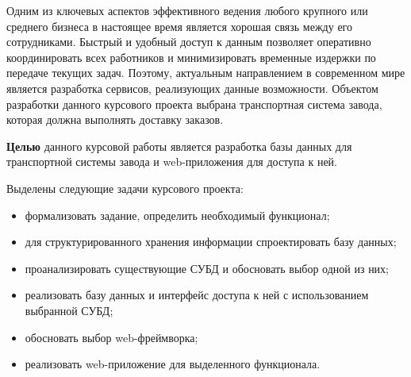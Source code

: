 Одним из ключевых аспектов эффективного ведения любого крупного или среднего бизнеса в настоящее время является хорошая связь между его сотрудниками. Быстрый и удобный доступ к данным позволяет оперативно координировать всех работников и минимизировать временные издержки по передаче текущих задач. Поэтому, актуальным направлением в современном мире является разработка сервисов, реализующих данные возможности. Объектом разработки данного курсового проекта выбрана транспортная система завода, которая должна выполнять доставку заказов.

\textbf{Целью} данного курсовой работы является разработка базы данных для транспортной системы завода и web-приложения для доступа к ней.

Выделены следующие задачи курсового проекта:
\begin{itemize}
	\item формализовать задание, определить необходимый функционал;
	\item для структурированного хранения информации спроектировать базу данных;
	\item проанализировать существующие СУБД и обосновать выбор одной из них;
	\item реализовать базу данных и интерфейс доступа к ней с использованием выбранной СУБД;
	\item обосновать выбор web-фреймворка;
	\item реализовать web-приложение для выделенного функционала.
\end{itemize}

